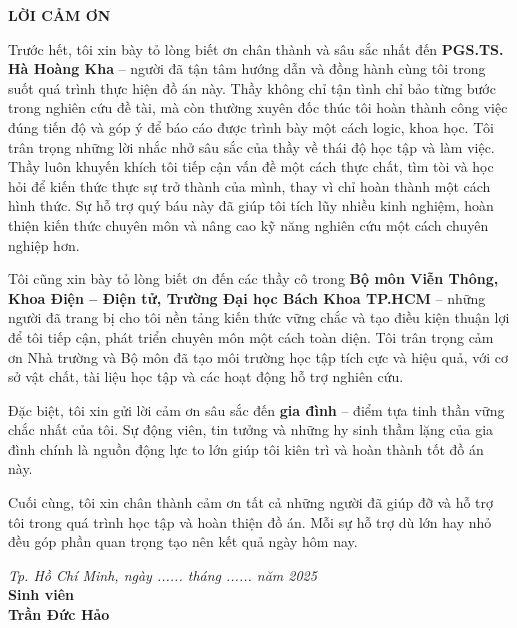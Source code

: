 \thispagestyle{empty}
\begin{center}
    \vspace*{1.5cm}
    \textbf{\fontsize{16}{19}\selectfont LỜI CẢM ƠN}
    \vspace{0.8cm}
\end{center}

\noindent
\setlength{\parindent}{1.5cm}
\setlength{\parskip}{6pt}
\fontsize{12}{14}\selectfont  

Trước hết, tôi xin bày tỏ lòng biết ơn chân thành và sâu sắc nhất đến \textbf{PGS.TS. Hà Hoàng Kha} – người đã tận tâm hướng dẫn và đồng hành cùng tôi trong suốt quá trình thực hiện đồ án này. Thầy không chỉ tận tình chỉ bảo từng bước trong nghiên cứu đề tài, mà còn thường xuyên đốc thúc tôi hoàn thành công việc đúng tiến độ và góp ý để báo cáo được trình bày một cách logic, khoa học. Tôi trân trọng những lời nhắc nhở sâu sắc của thầy về thái độ học tập và làm việc. Thầy luôn khuyến khích tôi tiếp cận vấn đề một cách thực chất, tìm tòi và học hỏi để kiến thức thực sự trở thành của mình, thay vì chỉ hoàn thành một cách hình thức. Sự hỗ trợ quý báu này đã giúp tôi tích lũy nhiều kinh nghiệm, hoàn thiện kiến thức chuyên môn và nâng cao kỹ năng nghiên cứu một cách chuyên nghiệp hơn.

Tôi cũng xin bày tỏ lòng biết ơn đến các thầy cô trong \textbf{Bộ môn Viễn Thông, Khoa Điện – Điện tử, Trường Đại học Bách Khoa TP.HCM} – những người đã trang bị cho tôi nền tảng kiến thức vững chắc và tạo điều kiện thuận lợi để tôi tiếp cận, phát triển chuyên môn một cách toàn diện. Tôi trân trọng cảm ơn Nhà trường và Bộ môn đã tạo môi trường học tập tích cực và hiệu quả, với cơ sở vật chất, tài liệu học tập và các hoạt động hỗ trợ nghiên cứu.

Đặc biệt, tôi xin gửi lời cảm ơn sâu sắc đến \textbf{gia đình} – điểm tựa tinh thần vững chắc nhất của tôi. Sự động viên, tin tưởng và những hy sinh thầm lặng của gia đình chính là nguồn động lực to lớn giúp tôi kiên trì và hoàn thành tốt đồ án này.

Cuối cùng, tôi xin chân thành cảm ơn tất cả những người đã giúp đỡ và hỗ trợ tôi trong quá trình học tập và hoàn thiện đồ án. Mỗi sự hỗ trợ dù lớn hay nhỏ đều góp phần quan trọng tạo nên kết quả ngày hôm nay.

\vspace{0.8cm}
\begin{flushright}
    \begin{minipage}{0.5\textwidth}
        \centering
        \textit{Tp. Hồ Chí Minh, ngày ...... tháng ...... năm 2025} \\
        \vspace{0.8cm}
        \textbf{Sinh viên} \\
        \vspace{0.3cm}
        \textbf{Trần Đức Hảo}
    \end{minipage}
\end{flushright}

\vfill
\clearpage
